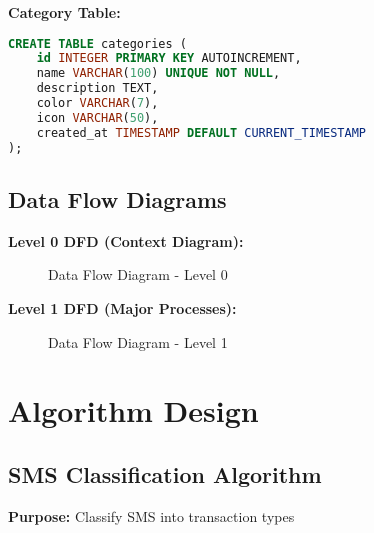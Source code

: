 \documentclass[11pt,a4paper]{report}
\begin{document}
\textbf{Category Table:}
\begin{lstlisting}[language=SQL]
CREATE TABLE categories (
    id INTEGER PRIMARY KEY AUTOINCREMENT,
    name VARCHAR(100) UNIQUE NOT NULL,
    description TEXT,
    color VARCHAR(7),
    icon VARCHAR(50),
    created_at TIMESTAMP DEFAULT CURRENT_TIMESTAMP
);
\end{lstlisting}

\subsection{Data Flow Diagrams}

\textbf{Level 0 DFD (Context Diagram):}

\begin{figure}[htbp]
    \centering
    \caption{Data Flow Diagram - Level 0}
    \label{fig:dfd0}
\end{figure}

\textbf{Level 1 DFD (Major Processes):}

\begin{figure}[htbp]
    \centering
    \caption{Data Flow Diagram - Level 1}
    \label{fig:dfd1}
\end{figure}

\section{Algorithm Design}

\subsection{SMS Classification Algorithm}

\textbf{Purpose:} Classify SMS into transaction types
\end{document}
